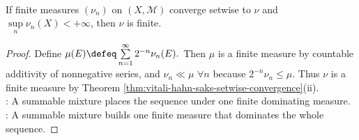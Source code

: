 \begin{corollary} \label{cor:nikodym-bounded-setwise-limits} \\
If finite measures $(\nu_n)$ on $(X,\mathcal{M})$ converge setwise to $\nu$ and $\sup\limits_n\nu_n(X)<+\infty$, then $\nu$ is finite.
\begin{proof}
Define
$\mu(E)\defeq\sum\limits_{n=1}^{\infty}2^{-n}\nu_n(E).$
Then $\mu$ is a finite measure by countable additivity of nonnegative series, and $\nu_n\ll\mu$ $\forall n$ because $2^{-n}\nu_n\leq\mu$. Thus $\nu$ is a finite measure by Theorem \ref{thm:vitali-hahn-saks-setwise-convergence}(ii).\\
: A summable mixture places the sequence under one finite dominating measure.\\
: A summable mixture builds one finite measure that dominates the whole sequence.
\end{proof}
\end{corollary}
